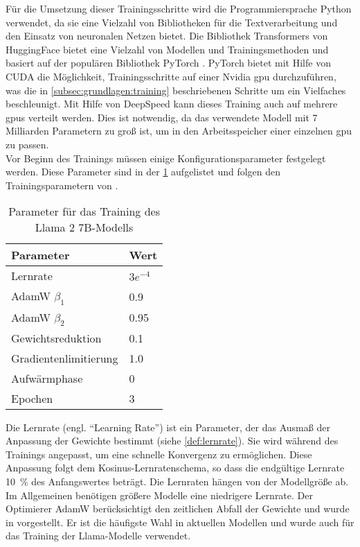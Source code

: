 Für die Umsetzung dieser Trainingsschritte wird die Programmiersprache Python verwendet, da sie eine Vielzahl von Bibliotheken für die Textverarbeitung und den Einsatz von neuronalen Netzen bietet.
Die Bibliothek Transformers von HuggingFace \citep{transformers} bietet eine Vielzahl von Modellen und Trainingsmethoden und basiert auf der populären Bibliothek PyTorch \citep{pytorch}.
PyTorch bietet mit Hilfe von CUDA die Möglichkeit, Trainingsschritte auf einer Nvidia \ac{gpu} durchzuführen, was die in \cref{subsec:grundlagen:training} beschriebenen Schritte um ein Vielfaches beschleunigt.
Mit Hilfe von DeepSpeed \citep{deepspeed} kann dieses Training auch auf mehrere \ac{gpu}s verteilt werden.
Dies ist notwendig, da das verwendete Modell mit 7 Milliarden Parametern zu groß ist, um in den Arbeitsspeicher einer einzelnen \ac{gpu} zu passen.\\

Vor Beginn des Trainings müssen einige Konfigurationsparameter festgelegt werden.
Diese Parameter sind in der \cref{tab:training:parameter} aufgelistet und folgen den Trainingsparametern von \citet{llama}.\\
\begin{table}
    \centering
    \begin{tabular}{ll}
        \toprule
        \textbf{Parameter}    & \textbf{Wert} \\
        \midrule
        Lernrate              & $3e^{-4}$     \\
        AdamW $\beta_1$       & \num{0,9}   \\
        AdamW $\beta_2$       & \num{0,95}   \\
        Gewichtsreduktion     & \num{0,1}   \\
        Gradientenlimitierung & \num{1,0}   \\
        Aufwärmphase          & \num{0}   \\
        Epochen               & \num{3}   \\
        \bottomrule
    \end{tabular}
    \caption[Parameter des Trainings]{Parameter für das Training des Llama 2 7B-Modells}\label{tab:training:parameter}
\end{table}

Die Lernrate (engl. \enquote{Learning Rate}) ist ein Parameter, der das Ausmaß der Anpassung der Gewichte bestimmt (siehe \cref{def:lernrate}).
Sie wird während des Trainings angepasst, um eine schnelle Konvergenz zu ermöglichen.
Diese Anpassung folgt dem Kosinus-Lernratenschema, so dass die endgültige Lernrate \SI{10}{\percent} des Anfangswertes beträgt.
Die Lernraten hängen von der Modellgröße ab.
Im Allgemeinen benötigen größere Modelle eine niedrigere Lernrate.
Der Optimierer AdamW berücksichtigt den zeitlichen Abfall der Gewichte und wurde in \citet{adamw} vorgestellt.
Er ist die häufigste Wahl in aktuellen Modellen und wurde auch für das Training der Llama-Modelle verwendet.\\

